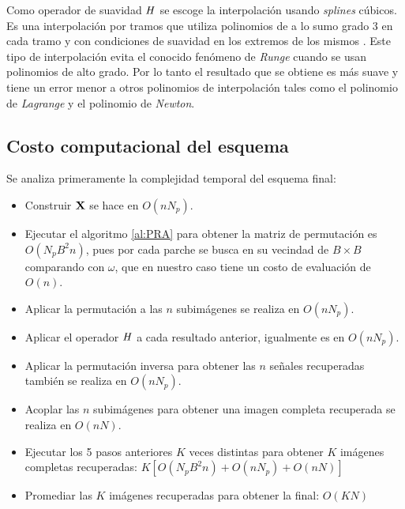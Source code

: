 Como operador de suavidad $\mathit{H}$ se escoge la interpolaci\'on usando \textit{splines} c\'ubicos. Es una interpolaci\'on por tramos que utiliza polinomios de a lo sumo grado $3$ en cada tramo y con condiciones de suavidad en los extremos de los mismos \cite{burden1996analisis}. Este tipo de interpolaci\'on evita el conocido fen\'omeno de \textit{Runge} cuando se usan polinomios de alto grado. Por lo tanto el resultado que se obtiene es m\'as suave y tiene un error menor a otros polinomios de interpolaci\'on tales como el polinomio de \textit{Lagrange} y el polinomio de \textit{Newton}.

\subsection{Costo computacional del esquema}

Se analiza primeramente la complejidad temporal del esquema final:

\begin{itemize}
	\item Construir $\mathbf{X}$ se hace en $O(nN_p)$.
	\item Ejecutar el algoritmo \ref{al:PRA} para obtener la matriz de permutaci\'on es $O(N_pB^2n)$, pues por cada parche se busca en su vecindad de $B \times B$ comparando con $\omega$, que en nuestro caso tiene un costo de evaluaci\'on de $O(n)$.
	\item Aplicar la permutaci\'on a las $n$ subim\'agenes se realiza en $O(nN_p)$.
	\item Aplicar el operador $\mathit{H}$ a cada resultado anterior, igualmente es en $O(nN_p)$.
	\item Aplicar la permutaci\'on inversa para obtener las $n$ señales recuperadas también se realiza en $O(nN_p)$.
	\item Acoplar las $n$ subim\'agenes para obtener una imagen completa recuperada se realiza en $O(nN)$.
	\item Ejecutar los 5 pasos anteriores $K$ veces distintas para obtener $K$ im\'agenes completas recuperadas: $K[O(N_pB^2n) + O(nN_p) + O(nN)]$
	\item Promediar las $K$ im\'agenes recuperadas para obtener la final: $O(KN)$
\end{itemize}

